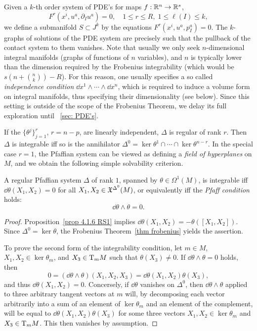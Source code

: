 \begin{rem}
    Given a $k$-th order system of PDE's for maps $f:\mathbb{R}^n\to \mathbb{R}^s$, 
    \[F^r(x^i,u^a,\partial_I u^a)=0,\quad 1\leq r\leq R,\; 1\leq \ell(I)\leq k,\]
    we define a submanifold $S\subset J^k$ by the equations $F^r(x^i,u^a,p_I^a)=0$. The $k$-graphs of solutions of the PDE system are precisely such that the pullback of the contact system to them vanishes. Note that usually we only seek $n$-dimensional integral manifolds (graphs of functions of $n$ variables), and $n$ is typically lower than the dimension required by the Frobenius integrability (which would be $s\left(n+\binom{n}{k}\right)-R$). For this reason, one usually specifies a so called \emph{independence condition} $\dd x^1\wedge\cdots\wedge\dd x^n$, which is required to induce a volume form on integral manifolds, thus specifying their dimensionality (see below). Since this setting is outside of the scope of the Frobenius Theorem, we delay its full exploration until \Sect~\ref{sec: PDE's}.
\end{rem}

If the $\{\theta^j\}_{j=1}^r$, $r=n-p$, are linearly independent, $\Delta$ is regular of rank $r$. Then $\Delta$ is integrable iff so is the annihilator $\Delta^0=\ker\theta^1\cap\cdots\cap\ker\theta^{n-r}$. In the special case $r=1$, the Pfaffian system can be viewed as defining a \emph{field of hyperplanes} on $M$, and we obtain the following simple solvability criterion.

\begin{prop}\label{prop 4.7.6 RS1 pfaffian rank 1}
    A regular Pfaffian system $\Delta$ of rank $1$, spanned by $\theta\in\Omega^1(M)$, is integrable iff $\dd\theta(X_1,X_2)=0$ for all $X_1,X_2\in\mathfrak{X}^{\Delta^0}(M)$, or equivalently iff the \emph{Pfaff condition} holds:
    \[\dd\theta\wedge\theta=0.\]
\end{prop}
\begin{proof}
    Proposition~\ref{prop 4.1.6 RS1} implies $\dd\theta(X_1,X_2)=-\theta([X_1,X_2])$. Since $\Delta^0=\ker\theta$, the Frobenius Theorem~\ref{thm frobenius} yields the assertion. 

    To prove the second form of the integrability condition, let $m\in M$, $X_1,X_2\in\ker\theta_m$, and $X_3\in \mathrm{T}_mM$ such that $\theta(X_3)\neq 0$. If $\dd\theta\wedge\theta=0$ holds, then 
    \[0=(\dd\theta\wedge\theta)(X_1,X_2,X_3)=\dd\theta(X_1,X_2)\theta(X_3),\]
    and thus $\dd \theta(X_1,X_2)=0$. Concersely, if $\dd\theta$ vanishes on $\Delta^0$, then $\dd \theta\wedge\theta$ applied to three arbitrary tangent vectors at $m$ will, by decomposing each vector arbitrarily into a sum of an element of $\ker\theta_m$ and an element of the complement, will be equal to $\dd \theta(X_1,X_2)\theta(X_3)$ for some three vectors $X_1,X_2\in \ker\theta_m$ and $X_3\in \mathrm{T}_m M$. This then vanishes by assumption.
\end{proof}

